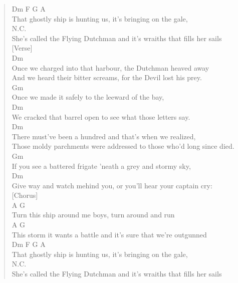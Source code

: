 \documentclass[11pt]{article}
\begin{document}
\begin{verse}
Dm                    F                G               A\\
That ghostly ship is hunting us, it's bringing on the gale,\\
\vspace*{1em}
N.C.\\
She's called the Flying Dutchman and it's wraiths that fills her sails\\
\vspace*{1em}
[Verse]\\
Dm\\
Once we charged into that harbour, the Dutchman heaved away\\
\vspace*{1em}
And we heard their bitter screams, for the Devil lost his prey.\\
\vspace*{1em}
Gm\\
Once we made it safely to the leeward of the bay,\\
\vspace*{1em}
Dm\\
We cracked that barrel open to see what those letters say.\\
\vspace*{1em}
\vspace*{1em}
Dm\\
There must've been a hundred and that's when we realized,\\
\vspace*{1em}
Those moldy parchments were addressed to those who'd long since died.\\
\vspace*{1em}
Gm\\
If you see a battered frigate 'neath a grey and stormy sky,\\
\vspace*{1em}
Dm\\
Give way and watch mehind you, or you'll hear your captain cry:\\
\vspace*{1em}
\vspace*{1em}
[Chorus]\\
A                              G\\
Turn this ship around me boys, turn around and run\\
\vspace*{1em}
A                                     G\\
This storm it wants a battle and it's sure that we're outgunned\\
\vspace*{1em}
Dm                    F                G               A\\
That ghostly ship is hunting us, it's bringing on the gale,\\
\vspace*{1em}
N.C.\\
She's called the Flying Dutchman and it's wraiths that fills her sails\\
\end{verse}
\clearpage
\end{document}
